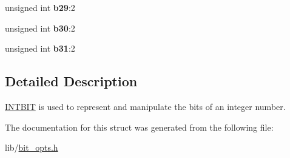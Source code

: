 \begin{DoxyCompactItemize}
\item 
\hypertarget{struct_i_n_t_b_i_t_a126d1091f11959910867b7c2ff881964}{unsigned int {\bfseries b29}\-:2}\label{struct_i_n_t_b_i_t_a126d1091f11959910867b7c2ff881964}

\item 
\hypertarget{struct_i_n_t_b_i_t_ad7064ac3ccc2d3c41f46df2fcb72a0cf}{unsigned int {\bfseries b30}\-:2}\label{struct_i_n_t_b_i_t_ad7064ac3ccc2d3c41f46df2fcb72a0cf}

\item 
\hypertarget{struct_i_n_t_b_i_t_ae24e0fc4e4af700b7a80a11c3b31d44f}{unsigned int {\bfseries b31}\-:2}\label{struct_i_n_t_b_i_t_ae24e0fc4e4af700b7a80a11c3b31d44f}

\end{DoxyCompactItemize}


\subsection{Detailed Description}
\hyperlink{struct_i_n_t_b_i_t}{I\-N\-T\-B\-I\-T} is used to represent and manipulate the bits of an integer number. 

The documentation for this struct was generated from the following file\-:\begin{DoxyCompactItemize}
\item 
lib/\hyperlink{bit__opts_8h}{bit\-\_\-opts.\-h}\end{DoxyCompactItemize}
